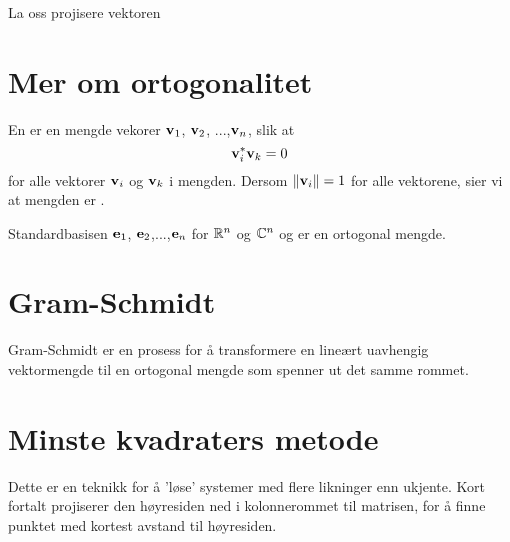 \begin{ex}
La oss projisere vektoren 
\end{ex}


\section*{Mer om ortogonalitet}
\begin{defnx}
En  er en mengde vekorer $\mathbf{v}_1$, $\mathbf{v}_2$, ...,$\mathbf{v}_n$, slik at
\[
\mathbf{v}_i^*  \mathbf{v}_k = 0
\]
for alle vektorer $\mathbf{v}_i$ og $\mathbf{v}_k$ i mengden. Dersom $\|\mathbf{v}_i \|=1$ for alle vektorene, sier vi at mengden er .
\end{defnx}


\begin{ex}
Standardbasisen $\mathbf{e}_1$, $\mathbf{e}_2$,...,$\mathbf{e}_n$ for $\mathbb{R}^n$ og $\mathbb{C}^n$ og  er en ortogonal mengde.
\end{ex}


\section*{Gram-Schmidt}
Gram-Schmidt er en prosess for å transformere en lineært uavhengig vektormengde til en ortogonal mengde som spenner ut det samme rommet. 

\section*{Minste kvadraters metode}
Dette er en teknikk for å 'løse' systemer med flere likninger enn ukjente. Kort fortalt projiserer den høyresiden ned i kolonnerommet til matrisen, for å finne punktet med kortest avstand til høyresiden.

\kapittelslutt
